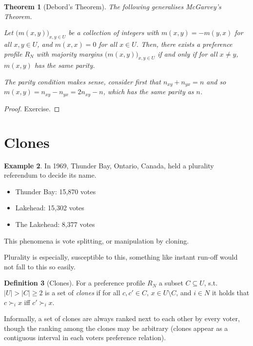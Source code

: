 \documentclass{book}
\theoremstyle{plain}
\newtheorem{theorem}{Theorem}[subsection]
\theoremstyle{definition}
\newtheorem{definition}[theorem]{Definition}
\newtheorem{example}[theorem]{Example}
\theoremstyle{remark}
\begin{document}
\begin{theorem}[Debord's Theorem]
    The following generalises 
    McGarvey's Theorem.


    Let $\big(m(x, y)\big)_{x, y \in U}$ be a collection of 
    integers with 
    $m(x, y) = - m(y, x)$ for all $x, y \in U$,
    and $m(x, x) = 0$ for all $x \in U$.
    Then, there exists a preference profile $R_N$ with majority margins
    $\big(m(x, y)\big)_{x, y \in U}$ if and only if 
    for all $x \neq y$, $m(x, y)$ has the same parity.

    The parity condition makes sense, consider first that 
    $n_{xy} + n_{yx} = n$ 
    and so $m(x, y) = n_{xy} - n_{yx} = 2n_{xy} - n$, 
    which has the same parity as $n$.
\end{theorem}
\begin{proof}
    Exercise.
\end{proof}

\section{Clones}

\begin{example}
    In 1969, Thunder Bay, Ontario, Canada, 
    held a plurality referendum to decide its name.
    \begin{itemize}
        \item Thunder Bay: 15,870 votes
        \item Lakehead: 15,302 votes
        \item The Lakehead: 8,377 votes
    \end{itemize}
    This phenomena is vote splitting, or 
    manipulation by cloning.

    Plurality is especially, susceptible to this, 
    something like instant run-off would
    not fall to this so easily.
\end{example}

\begin{definition}[Clones]
    For a preference profile $R_N$ a 
    subset $C \subseteq U$, s.t. $|U| > |C| \geq 2$ is a set of 
    \emph{clones} if for all 
    $c, c' \in C$, $x \in U \setminus C$, and $i \in N$ it holds that 
    $c \succ_i x$ iff $c' \succ_i x$.

    Informally, a set of clones are always ranked next to each other by every voter, 
    though the ranking among the clones may be arbitrary (clones appear as a contiguous interval in 
    each voters preference relation).
\end{definition}
\end{document}
